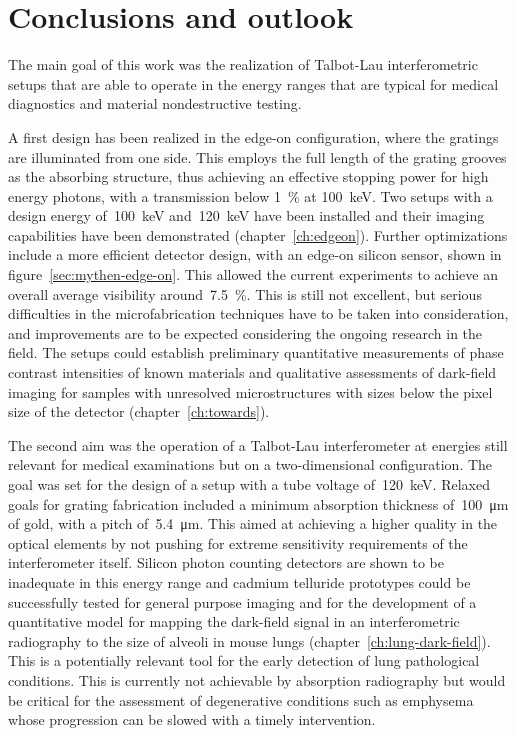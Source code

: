 \chapter{Conclusions and outlook}\label{ch:conclusions}
The main goal of this work was the realization of Talbot-Lau interferometric
setups that are able to operate in the energy ranges that are typical for
medical diagnostics and material nondestructive testing.

A first design has been realized in the edge-on configuration, where the
gratings are illuminated from one side. This employs the full length of the
grating grooves as the absorbing structure, thus achieving an effective
stopping power for high energy photons, with a transmission below
\SI{1}{\percent} at \SI{100}{\kilo\eV}. Two setups with a design energy
of~\SI{100}{\kilo\eV} and~\SI{120}{\kilo\eV} have been installed and their
imaging capabilities have been demonstrated (chapter~\ref{ch:edgeon}).
Further optimizations include a more efficient detector design, with an
edge-on silicon sensor, shown in figure~\ref{sec:mythen-edge-on}. This
allowed the current experiments to achieve an overall average visibility
around~\SI{7.5}{\percent}. This is still not excellent, but serious
difficulties in the microfabrication techniques have to be taken into
consideration, and improvements are to be expected considering the ongoing
research in the field. The setups could establish preliminary quantitative
measurements of phase contrast intensities of known materials and
qualitative assessments of dark-field imaging for samples with unresolved
microstructures with sizes below the pixel size of the detector
(chapter~\ref{ch:towards}).

The second aim was the operation of a Talbot-Lau interferometer at energies
still relevant for medical examinations but on a two-dimensional
configuration. The goal was set for the design of a setup with a tube
voltage of~\SI{120}{\kilo\eV}. Relaxed goals for grating fabrication
included a minimum absorption thickness of~\SI{100}{\micro\meter} of gold,
with a pitch of~\SI{5.4}{\micro\meter}. This aimed at achieving a higher
quality in the optical elements by not pushing for extreme sensitivity
requirements of the interferometer itself.
Silicon photon counting detectors are shown
to be inadequate in this energy range and cadmium telluride prototypes could
be successfully tested for general purpose imaging and for the development
of a quantitative model for mapping the dark-field signal in an
interferometric radiography to the size of alveoli in mouse lungs
(chapter~\ref{ch:lung-dark-field}). This is a
potentially relevant tool for the early detection of lung pathological
conditions. This is currently not achievable by absorption radiography but
would be critical for the assessment of degenerative conditions such as
emphysema whose progression can be slowed with a timely intervention.

